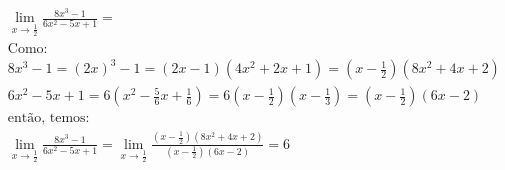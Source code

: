 \begin{ex}
\begin{align}
&\lim_{x\rightarrow \frac{1}{2}} \frac{8x^3-1}{6x^2-5x+1}=\nonumber\\
&\text{Como:}\nonumber\\
&8x^3-1=(2x)^3-1=(2x-1)(4x^2+2x+1)=(x-\frac{1}{2})(8x^2+4x+2)\nonumber\\
&6x^2-5x+1=6(x^2-\frac{5}{6}x+\frac{1}{6})=6(x-\frac{1}{2})(x-\frac{1}{3})=(x-\frac{1}{2})(6x-2)\nonumber\\
&\text{então, temos:}\nonumber\\
&\lim_{x\rightarrow \frac{1}{2}} \frac{8x^3-1}{6x^2-5x+1}=\lim_{x\rightarrow \frac{1}{2}} \frac{(x-\frac{1}{2})(8x^2+4x+2)}{(x-\frac{1}{2})(6x-2)}=6\nonumber
\end{align}
\end{ex}